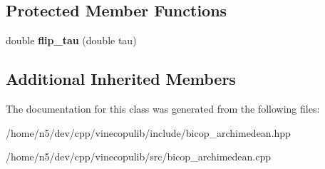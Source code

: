 \subsection*{Protected Member Functions}
\begin{DoxyCompactItemize}
\item 
double {\bfseries flip\+\_\+tau} (double tau)\hypertarget{classvinecopulib_1_1_archimedean_bicop_a7ded3792cb1eebe53e97076f2e681137}{}\label{classvinecopulib_1_1_archimedean_bicop_a7ded3792cb1eebe53e97076f2e681137}

\end{DoxyCompactItemize}
\subsection*{Additional Inherited Members}


The documentation for this class was generated from the following files\+:\begin{DoxyCompactItemize}
\item 
/home/n5/dev/cpp/vinecopulib/include/bicop\+\_\+archimedean.\+hpp\item 
/home/n5/dev/cpp/vinecopulib/src/bicop\+\_\+archimedean.\+cpp\end{DoxyCompactItemize}
